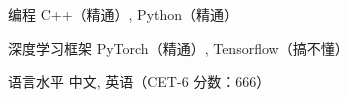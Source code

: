 

\begin{cvskills}

  \cvskill
    {编程} %
    {C++（精通）, Python（精通）} %

  \cvskill
    {深度学习框架} %
    {PyTorch（精通）,  Tensorflow（搞不懂）} %

  \cvskill
    {语言水平} %
    {中文, 英语（CET-6 分数：666）} %

\end{cvskills}
